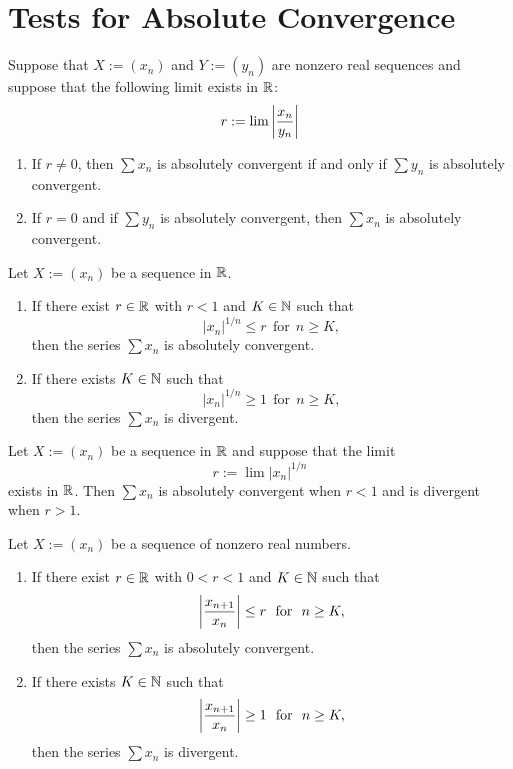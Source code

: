 \section{Tests for Absolute Convergence}

\begin{theorem}
	Suppose that $X:=(x_n)$ and $Y:=(y_n)$ are nonzero real sequences and suppose that the following limit exists in $\mathbb{R}$:
	\[r:=\lim\left\lvert \frac{x_n}{y_n} \right\rvert\]
	\begin{enumerate}
		\item If $r \neq 0$, then $\sum x_n$ is absolutely convergent if and only if $\sum y_n$ is absolutely convergent.
		\item If $r=0$ and if $\sum y_n$ is absolutely convergent, then $\sum x_n$ is absolutely convergent.
	\end{enumerate}
\end{theorem}

\begin{theorem}
	Let $X:=(x_n)$ be a sequence in $\mathbb{R}$.
	\begin{enumerate}
		\item If there exist $r \in \mathbb{R}$ with $r<1$ and $K \in \mathbb{N}$ such that
		      \[|x_n|^{1/n}\leq r\ \ \text{for}\ \ n \geq K,\]
		      then the series $\sum x_n$ is absolutely convergent.
		\item If there exists $K \in \mathbb{N}$ such that
		      \[|x_n|^{1/n} \geq 1\ \ \text{for}\ \ n \geq K,\]
		      then the series $\sum x_n$ is divergent.
	\end{enumerate}
\end{theorem}

\begin{corollary}
	Let $X:=(x_n)$ be a sequence in $\mathbb{R}$ and suppose that the limit
	\[r:=\lim |x_n|^{1/n}\]
	exists in $\mathbb{R}$. Then $\sum x_n$ is absolutely convergent when $r < 1$ and is divergent when $r > 1$.
\end{corollary}

\begin{theorem}
	Let $X := (x_n)$ be a sequence of nonzero real numbers.
	\begin{enumerate}
		\item If there exist $r \in \mathbb{R}$ with $0<r<1$ and $K \in \mathbb{N}$ such that
		      \[\abs{\frac{x_{n+1}}{x_n}}\leq r\ \ \text{for}\ \ n \geq K,\]
		      then the series $\sum x_n$ is absolutely convergent.
		\item If there exists $K \in \mathbb{N}$ such that
		      \[\abs{\frac{x_{n+1}}{x_n}}\geq 1\ \ \text{for}\ \ n \geq K,\]
		      then the series $\sum x_n$ is divergent.
	\end{enumerate}
\end{theorem}

